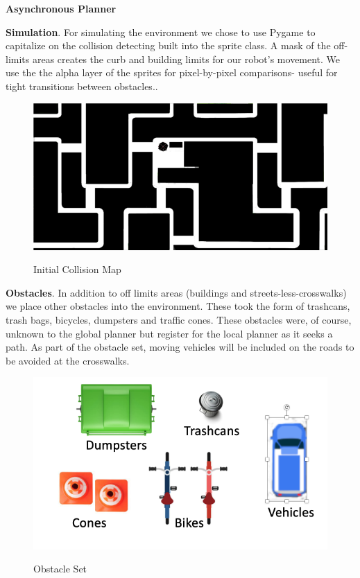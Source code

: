 \documentclass{article}
\begin{document}
\begin{multicols}{2}
\noindent \textbf{Asynchronous Planner}

\noindent \textbf{Simulation}. For simulating the environment we chose to use Pygame to capitalize on the collision detecting built into the sprite class.  A mask of the off-limits areas creates the curb and building limits for our robot's movement. We use the the alpha layer of the sprites for pixel-by-pixel comparisons- useful for tight transitions between obstacles..\
\begin{figure}[H]
   \centering
    \includegraphics[width = 1\columnwidth]{figures/mask.png}
     \label{fig:mask}
     \caption{Initial Collision Map}
\end{figure}

\noindent \textbf{Obstacles}. In addition to off limits areas (buildings and streets-less-crosswalks) we place other obstacles into the environment.  These took the form of trashcans, trash bags, bicycles, dumpsters and traffic cones.  These obstacles were, of course, unknown to the global planner but register for the local planner as it seeks a path.  As part of the obstacle set, moving vehicles will be included on the roads to be avoided at the crosswalks.
\begin{figure}[H]
   \centering
    \includegraphics[width = 1\columnwidth]{figures/obstacles.png}
     \label{fig:obstacles}
     \caption{Obstacle Set}
\end{figure}



\end{multicols}
\end{document}
